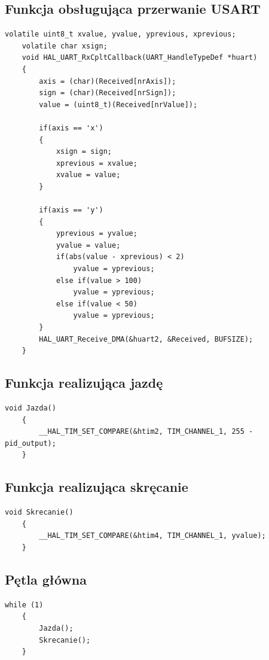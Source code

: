 \documentclass[10pt, a4paper]{article}
\begin{document}
\subsection{Funkcja obsługująca przerwanie USART}

	\begin{lstlisting}[tabsize=2]
	volatile uint8_t xvalue, yvalue, yprevious, xprevious;
	volatile char xsign;
	void HAL_UART_RxCpltCallback(UART_HandleTypeDef *huart) 
	{
		axis = (char)(Received[nrAxis]);
		sign = (char)(Received[nrSign]);
		value = (uint8_t)(Received[nrValue]);
		
		if(axis == 'x')
		{
			xsign = sign;
			xprevious = xvalue;
			xvalue = value;
		}
		
		if(axis == 'y')
		{
			yprevious = yvalue;
			yvalue = value;
			if(abs(value - xprevious) < 2)
				yvalue = yprevious;
			else if(value > 100)
				yvalue = yprevious;
			else if(value < 50)
				yvalue = yprevious;
		}
		HAL_UART_Receive_DMA(&huart2, &Received, BUFSIZE);
	}
	\end{lstlisting}
	
	\subsection{Funkcja realizująca jazdę}
	
	\begin{lstlisting}[tabsize=2]
	void Jazda()
	{
		__HAL_TIM_SET_COMPARE(&htim2, TIM_CHANNEL_1, 255 - pid_output);
	}
	\end{lstlisting}
	
	\subsection{Funkcja realizująca skręcanie}
	
	\begin{lstlisting}[tabsize=2]
	void Skrecanie()
	{
		__HAL_TIM_SET_COMPARE(&htim4, TIM_CHANNEL_1, yvalue);
	}
	\end{lstlisting}
	
	\subsection{Pętla główna}
	
	\begin{lstlisting}[tabsize=2]
	while (1)
	{
		Jazda();
		Skrecanie();
	}
	\end{lstlisting}

\end{document}

